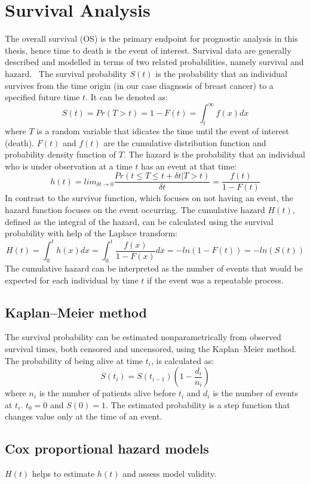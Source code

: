 \section{Survival Analysis}
The overall survival (OS) is the primary endpoint for prognostic analysis in this thesis,
hence time to death is the event of interest. 
Survival data are generally described and modelled in terms of two related probabilities, namely survival and hazard.~\cite{clark2003survival}
The survival probability $S(t)$ is the probability that an individual survives from the time origin (in our case diagnosis of breast cancer) to a specified future time $t$.
It can be denoted as: $$S(t) = Pr(T>t) = 1-F(t) = \int_t^\infty f(x) dx $$
where $T$ is a random variable that idicates the time until the event of interest (death). $F(t)$ and $f(t)$ are the cumulative distribution function
and probability density function of $T$. 
The hazard is the probability that an individual who is under observation at a time $t$ has an event at that time:
$$h(t) = lim_{\delta t \rightarrow 0}\frac{Pr(t \leq T \leq t + \delta t | T > t)}{\delta t} = \frac{f(t)}{1-F(t)}$$
In contrast to the survivor function, which focuses on not having an event, the hazard function focuses on the event occurring. 
The cumulative hazard $H(t)$, defined as the integral of the hazard,
can be calculated using the survival probability with help of the Laplace transform:
$$ H(t) = \int_0^t h(x) dx = \int_0^t \frac{f(x)}{1-F(x)} dx = - ln(1 - F(t)) = - ln(S(t)) $$
The cumulative hazard can be interpreted as the number of events that would be expected for each individual by time $t$ if the event was a repeatable process.~\cite{clark2003survival}

\subsection{Kaplan–Meier method}
The survival probability can be estimated nonparametrically from observed survival times,
both censored and uncensored, using the Kaplan–Meier method.
The probability of being alive at time $t_i$, is calculated as:
$$S(t_i) = S(t_{i-1}) (1-\frac{d_i}{n_i})$$
where $n_i$ is the number of patients alive before $t_i$ and $d_i$ is the number of events at $t_i$. $t_0=0$ and $S(0)=1$.
The estimated probability is a step function that changes value only at the time of an event.

\subsection{Cox proportional hazard models}
$H(t)$ helps to estimate $h(t)$ and assess model validity.
